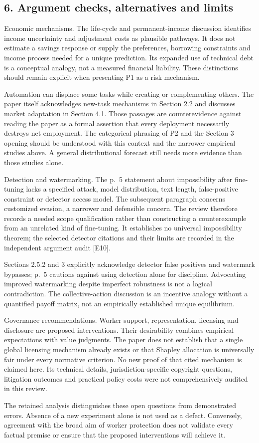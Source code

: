 \documentclass[10pt]{article}
\begin{document}
\subsection*{6. Argument checks, alternatives and limits}
Economic mechanisms. The life-cycle and permanent-income discussion identifies income uncertainty and adjustment costs as plausible pathways. It does not estimate a savings response or supply the preferences, borrowing constraints and income process needed for a unique prediction. Its expanded use of technical debt is a conceptual analogy, not a measured financial liability. These distinctions should remain explicit when presenting P1 as a risk mechanism.\par
Automation can displace some tasks while creating or complementing others. The paper itself acknowledges new-task mechanisms in Section 2.2 and discusses market adaptation in Section 4.1. Those passages are counterevidence against reading the paper as a formal assertion that every deployment necessarily destroys net employment. The categorical phrasing of P2 and the Section 3 opening should be understood with this context and the narrower empirical studies above. A general distributional forecast still needs more evidence than those studies alone.\par
Detection and watermarking. The p. 5 statement about impossibility after fine-tuning lacks a specified attack, model distribution, text length, false-positive constraint or detector access model. The subsequent paragraph concerns customized evasion, a narrower and defensible concern. The review therefore records a needed scope qualification rather than constructing a counterexample from an unrelated kind of fine-tuning. It establishes no universal impossibility theorem; the selected detector citations and their limits are recorded in the independent argument audit [E10].\par
Sections 2.5.2 and 3 explicitly acknowledge detector false positives and watermark bypasses; p. 5 cautions against using detection alone for discipline. Advocating improved watermarking despite imperfect robustness is not a logical contradiction. The collective-action discussion is an incentive analogy without a quantified payoff matrix, not an empirically established unique equilibrium.\par
Governance recommendations. Worker support, representation, licensing and disclosure are proposed interventions. Their desirability combines empirical expectations with value judgments. The paper does not establish that a single global licensing mechanism already exists or that Shapley allocation is universally fair under every normative criterion. No new proof of that cited mechanism is claimed here. Its technical details, jurisdiction-specific copyright questions, litigation outcomes and practical policy costs were not comprehensively audited in this review.\par
The retained analysis distinguishes these open questions from demonstrated errors. Absence of a new experiment alone is not used as a defect. Conversely, agreement with the broad aim of worker protection does not validate every factual premise or ensure that the proposed interventions will achieve it.\par
\end{document}

